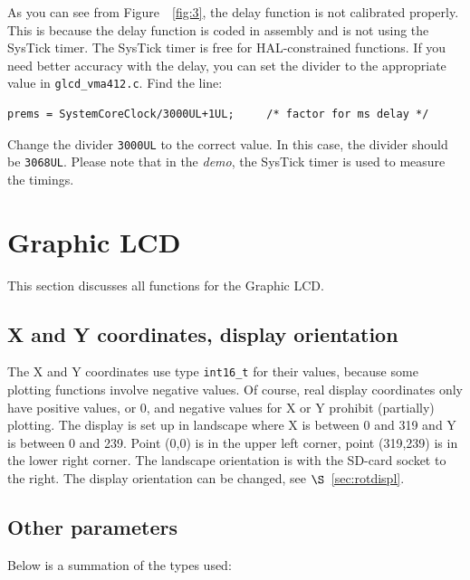 \documentclass[12pt]{article}
\begin{document}
As you can see from Figure~~\ref{fig:3}, the delay function is not calibrated properly. This is because the delay function is coded in assembly and is not using the SysTick timer. The SysTick timer is free for HAL-constrained functions. If you need better accuracy with the delay, you can set the divider to the appropriate value in \lstinline|glcd_vma412.c|. Find the line:

\begin{lstlisting}
prems = SystemCoreClock/3000UL+1UL;     /* factor for ms delay */
\end{lstlisting} 

Change the divider \lstinline|3000UL| to the correct value. In this case, the divider should be \lstinline|3068UL|. Please note that in the \textsl{demo}, the SysTick timer is used to measure the timings.

\section{Graphic LCD}
This section discusses all functions for the Graphic LCD.

\subsection{X and Y coordinates, display orientation}
The X and Y coordinates use type \lstinline|int16_t| for their values, because some plotting functions involve negative values. Of course, real display coordinates only have positive values, or 0, and negative values for X or Y prohibit (partially) plotting. The display is set up in landscape where X is between 0 and 319 and Y is between 0 and 239. Point (0,0) is in the upper left corner, point (319,239) is in the lower right corner. The landscape orientation is with the SD-card socket to the right.
The display orientation can be changed, see $\S$~\ref{sec:rotdispl}.

\subsection{Other parameters}
Below is a summation of the types used:
\end{document}
